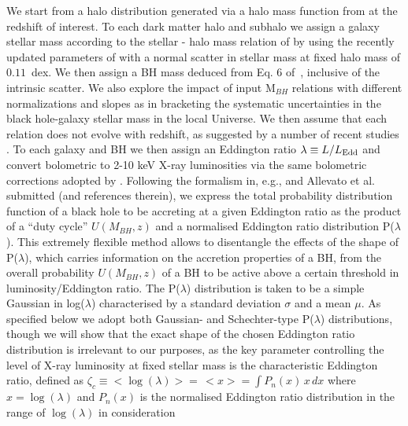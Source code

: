 We start from a halo distribution generated via a halo mass function from \citet{2008ApJ...688..709T} at the redshift of interest. To each dark matter halo and subhalo we assign a galaxy stellar mass according to the stellar - halo mass relation of \citet[][]{moster10} by using the recently updated parameters of \citet[][Eq.~5]{2019MNRAS.483.2506G} with a normal scatter in stellar mass at fixed halo mass of $0.11$~dex.
We then assign a BH mass deduced from Eq.
6 of~\cite{2016MNRAS.460.3119S}, inclusive of the intrinsic scatter. We also explore the impact of input M$_{BH}$ relations with different normalizations and slopes as in \citet{2015ApJ...813...82R,2018ApJ...869..113D,2019ApJ...876..155S} bracketing the systematic uncertainties in the black hole-galaxy stellar mass in the local Universe. 
We then assume that each relation does not evolve with redshift, as suggested by a number of recent studies \citep[e.g.][]{2019ApJ...885L..36D, Suh20, Shankar20MNRAS, 2020A&A...642A..65C}.
To each galaxy and BH we then assign an Eddington ratio $\lambda\equiv L/L_{\rm Edd}$ and convert bolometric to 2-10 keV X-ray luminosities via the same bolometric corrections adopted by \citet{2020A&A...642A..65C}. Following the formalism in, e.g., \citet{Shankar13Acc} and Allevato et al. submitted (and references therein), we express the total probability distribution function of a black hole to be accreting at a given Eddington ratio as the product of a ``duty cycle'' $U(M_{BH},z)$ and a normalised Eddington ratio distribution P($\lambda$). This extremely flexible method allows to disentangle the effects of the shape of P($\lambda$), which carries information on the accretion properties of a BH, from the overall probability $U(M_{BH},z)$ of a BH to be active above a certain threshold in luminosity/Eddington ratio. The P($\lambda$) distribution is taken to be a simple Gaussian in log($\lambda$) characterised by a standard deviation $\sigma$ and a mean $\mu$. As specified below we adopt both Gaussian- and Schechter-type P($\lambda$) distributions, though we will show that the exact shape of the chosen Eddington ratio distribution is irrelevant to our purposes, as the key parameter controlling the level of X-ray luminosity at fixed stellar mass is the characteristic Eddington ratio, defined as $\zeta_c\equiv<\log (\lambda)>=\,<x>=\int P_n(x)\,x \,dx$ where $x=\log(\lambda)$ and $P_n(x)$ is the normalised Eddington ratio distribution in the range of $\log(\lambda)$ in consideration %

